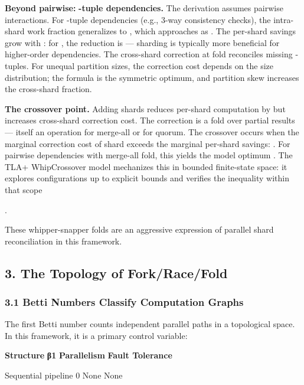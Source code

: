\documentclass[
]{article}
\begin{document}
\textbf{Beyond pairwise:} \textbf{-tuple dependencies.} The derivation
assumes pairwise interactions. For -tuple dependencies (e.g., 3-way
consistency checks), the intra-shard work fraction generalizes to ,
which approaches as . The per-shard savings grow with : for , the
reduction is --- sharding is typically more beneficial for higher-order
dependencies. The cross-shard correction at fold reconciles missing
-tuples. For unequal partition sizes, the correction cost depends on the
size distribution; the formula is the symmetric optimum, and partition
skew increases the cross-shard fraction.

\textbf{The crossover point.} Adding shards reduces per-shard
computation by but increases cross-shard correction cost. The correction
is a fold over partial results --- itself an operation for merge-all or
for quorum. The crossover occurs when the marginal correction cost of
shard exceeds the marginal per-shard savings: . For pairwise
dependencies with merge-all fold, this yields the model optimum . The
TLA+ WhipCrossover model mechanizes this in bounded finite-state space:
it explores configurations up to explicit bounds and verifies the
inequality within that scope

.

These whipper-snapper folds are an aggressive expression of parallel
shard reconciliation in this framework.

\subsection{\texorpdfstring{\textbf{3. The Topology of
Fork/Race/Fold}}{3. The Topology of Fork/Race/Fold}}\label{the-topology-of-forkracefold}

\subsubsection{\texorpdfstring{\textbf{3.1 Betti Numbers Classify
Computation
Graphs}}{3.1 Betti Numbers Classify Computation Graphs}}\label{betti-numbers-classify-computation-graphs}

The first Betti number counts independent parallel paths in a
topological space. In this framework, it is a primary control variable:

\textbf{Structure} \textbar{} \textbf{β1\hspace{0pt}} \textbar{}
\textbf{Parallelism} \textbar{} \textbf{Fault Tolerance} \textbar{}

Sequential pipeline \textbar{} 0 \textbar{} None \textbar{} None
\textbar{}
\end{document}
